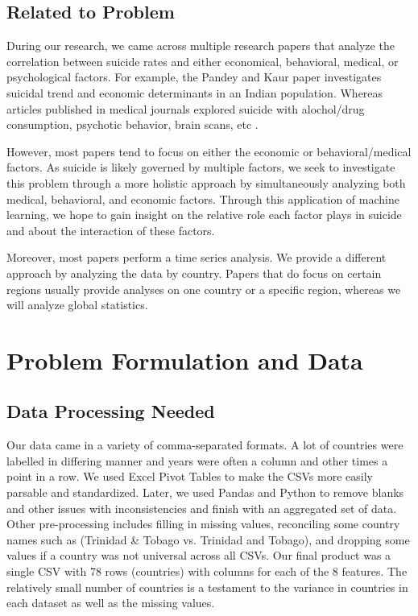 \documentclass{article}
\begin{document}
\begin{multicols}{2}
\subsection{Related to Problem} 

During our research, we came across multiple research papers that analyze the correlation between suicide rates and either economical, behavioral, medical, or psychological factors. For example, the Pandey and Kaur paper investigates suicidal trend and economic determinants in an Indian population. Whereas articles published in medical journals explored suicide with alochol/drug consumption, psychotic behavior, brain scans, etc . 

However, most papers tend to focus on either the economic or behavioral/medical factors. As suicide is likely governed by multiple factors, we seek to investigate this problem through a more holistic approach by simultaneously analyzing both medical, behavioral, and economic factors. Through this application of machine learning, we hope to gain insight on the relative role each factor plays in suicide and about the interaction of these factors. 

Moreover, most papers perform a time series analysis. We provide a different approach by analyzing the data by country. Papers that do focus on certain regions usually provide analyses on one country or a specific region, whereas we will analyze global statistics. 


\section{Problem Formulation and Data} 
\subsection{Data Processing Needed} Our data came in a variety of comma-separated formats. A lot of countries were labelled in differing manner and years were often a column and other times a point in a row. We used Excel Pivot Tables to make the CSVs more easily parsable and standardized. Later, we used Pandas and Python to remove blanks and other issues with inconsistencies and finish with an aggregated set of data. Other pre-processing includes filling in missing values, reconciling some country names such as (Trinidad \& Tobago vs. Trinidad and Tobago), and dropping some values if a country was not universal across all CSVs. Our final product was a single CSV with 78 rows (countries) with columns for each of the 8 features. The relatively small number of countries is a testament to the variance in countries in each dataset as well as the missing values.

\end{multicols}
\end{document}
